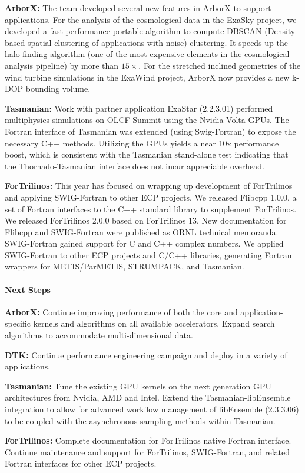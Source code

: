 {\bf ArborX:} The team developed several new features in ArborX to support
applications. For the analysis of the cosmological data in the ExaSky
project, we developed a fast performance-portable algorithm to compute DBSCAN
(Density-based spatial clustering of applications with noise) clustering. It
speeds up the halo-finding algorithm (one of the most expensive elements in the
cosmological analysis pipeline) by more than $15\times$. For the stretched
inclined geometries of the wind turbine simulations in the ExaWind project,
ArborX now provides a new k-DOP bounding volume.

{\bf Tasmanian:} Work with partner application ExaStar (2.2.3.01) performed
multiphysics simulations on OLCF Summit using the Nvidia Volta GPUs.
The Fortran interface of Tasmanian was extended (using Swig-Fortran)
to expose the necessary C++ methods. Utilizing the GPUs yields a near 10x
performance boost, which is consistent with the Tasmanian stand-alone test
indicating that the Thornado-Tasmanian interface does not incur appreciable
overhead.

{\bf ForTrilinos:} This year has focused on wrapping up development of
ForTrilinos and applying SWIG-Fortran to other ECP projects. We released Flibcpp
1.0.0, a set of Fortran interfaces to the C++ standard library to supplement
ForTrilinos. We released ForTrilinos 2.0.0 based on ForTrilinos 13. New
documentation for Flibcpp and SWIG-Fortran were published as ORNL technical
memoranda. SWIG-Fortran gained support for C and C++ complex numbers.
We applied SWIG-Fortran to other ECP projects and C/C++ libraries, generating
Fortran wrappers for METIS/ParMETIS, STRUMPACK, and Tasmanian.


\paragraph{Next Steps}

\indent

{\bf ArborX:} Continue improving performance of both the core and
application-specific kernels and algorithms on all available accelerators.
Expand search algorithms to accommodate multi-dimensional data.

{\bf DTK:} Continue performance engineering campaign and deploy in a variety of
applications.

{\bf Tasmanian:} Tune the existing GPU kernels on the next generation
GPU architectures from Nvidia, AMD and Intel.
Extend the Tasmanian-libEnsemble integration to allow for advanced workflow
management of libEnsemble (2.3.3.06) to be coupled with the asynchronous sampling
methods within Tasmanian.

{\bf ForTrilinos:} Complete documentation for ForTrilinos native Fortran
interface. Continue maintenance and support for ForTrilinos, SWIG-Fortran, and
related Fortran interfaces for other ECP projects.

